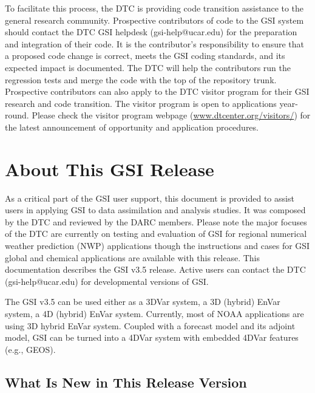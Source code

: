 To facilitate this process, the DTC is providing code transition assistance to the general research community. Prospective contributors of code to the GSI system should contact the DTC GSI helpdesk (gsi-help@ucar.edu) for the preparation and integration of their code.  It is the contributor's responsibility to ensure that a proposed code change is correct,  meets the GSI coding standards, and its expected impact is documented. The DTC will help the contributors run the regression tests and merge the code with the top of the repository trunk. Prospective contributors can also apply to the DTC visitor program for their GSI research and code transition. The visitor program is open to applications year-round. Please check the visitor program webpage (\url{www.dtcenter.org/visitors/})  for the latest announcement of opportunity and application procedures.  

\section{About This GSI Release}

As a critical part of the GSI user support, this document is provided to assist users in applying GSI to data assimilation and analysis studies. It was composed by the DTC and reviewed by the DARC members. Please note the major focuses of the DTC are currently on testing and evaluation of GSI for regional numerical weather prediction (NWP) applications though the instructions and cases for GSI global and chemical applications are available with this release. This documentation describes the GSI v3.5 release. Active users can contact the DTC (gsi-help@ucar.edu) for developmental versions of GSI.

The GSI v3.5 can be used either as a 3DVar system, a 3D (hybrid) EnVar system, a 4D (hybrid) EnVar system. Currently, most of NOAA applications are using 3D hybrid EnVar system. Coupled with a forecast model and its adjoint model, GSI can be turned into a 4DVar system with embedded 4DVar features (e.g., GEOS).

\subsection{What Is New in This Release Version}

